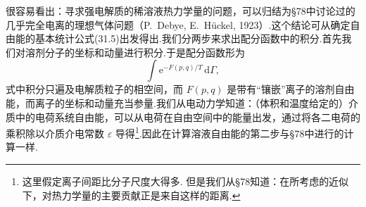 很容易看出：寻求强电解质的稀溶液热力学量的问题，可以归结为§78中讨论过的几乎完全电离的理想气体问题（P.~Debye, E.~H\"uckel, 1923）.这个结论可从确定自由能的基本统计公式(31.5)出发得出.我们分两步来求出配分函数中的积分.首先我们对溶剂分子的坐标和动量进行积分.于是配分函数形为
\begin{equation*}
  \int\mathrm{e}^{-F(p,q)/T}\,\mathrm{d}\varGamma,
\end{equation*}
式中积分只遍及电解质粒子的相空间，而 $F(p,q)$ 是带有“镶嵌”离子的溶剂自由能，而离子的坐标和动量充当参量.我们从电动力学知道：（体积和温度给定的）介质中的电荷系统自由能，可以从电荷在自由空间中的能量出发，通过将各二电荷的乘积除以介质介电常数 $\varepsilon$ 导得\footnote{这里假定离子间距比分子尺度大得多. 但是我们从§78知道：在所考虑的近似下，对热力学量的主要贡献正是来自这样的距离.}.因此在计算溶液自由能的第二步与§78中进行的计算一样.

